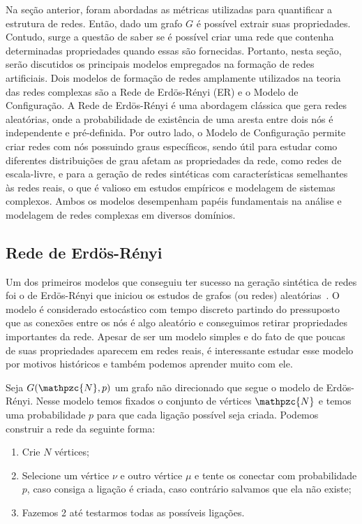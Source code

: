 Na seção anterior, foram abordadas as métricas utilizadas para quantificar a estrutura de redes. Então, dado um grafo $G$ é possível extrair suas propriedades. Contudo, surge a questão de saber se é possível criar uma rede que contenha determinadas propriedades quando essas são fornecidas. Portanto, nesta seção, serão discutidos os principais modelos empregados na formação de redes artificiais. Dois modelos de formação de redes amplamente utilizados na teoria das redes complexas são a Rede de Erdös-Rényi (ER) e o Modelo de Configuração. A Rede de Erdös-Rényi é uma abordagem clássica que gera redes aleatórias, onde a probabilidade de existência de uma aresta entre dois nós é independente e pré-definida. Por outro lado, o Modelo de Configuração permite criar redes com nós possuindo graus específicos, sendo útil para estudar como diferentes distribuições de grau afetam as propriedades da rede, como redes de escala-livre, e para a geração de redes sintéticas com características semelhantes às redes reais, o que é valioso em estudos empíricos e modelagem de sistemas complexos. Ambos os modelos desempenham papéis fundamentais na análise e modelagem de redes complexas em diversos domínios.

\subsection{Rede de Erdös-Rényi}

Um dos primeiros modelos que conseguiu ter sucesso na geração sintética de redes foi o de Erdös-Rényi que iniciou os estudos de grafos (ou redes) aleatórias~\cite{Erdos:1959:pmd}. O modelo é considerado estocástico com tempo discreto partindo do pressuposto que as conexões entre os nós é algo aleatório e conseguimos retirar propriedades importantes da rede. 
Apesar de ser um modelo simples e do fato de que 
poucas de suas 
propriedades aparecem em redes reais, é interessante estudar esse modelo por motivos históricos e também podemos aprender muito com ele.

Seja $G(\mathpzc{N},p)$ um grafo não direcionado que segue o modelo de Erdös-Rényi. Nesse modelo temos fixados o conjunto de vértices $\mathpzc{N}$ e temos uma probabilidade $p$ para que cada ligação 
possível seja criada. Podemos construir a rede da seguinte forma:
\begin{enumerate}
  \item Crie $N$ vértices;
  \item Selecione um vértice $\nu$ e outro vértice $\mu$ e tente os conectar com probabilidade $p$, caso consiga a ligação é criada, caso contrário salvamos que ela não existe;
  \item Fazemos 2 até testarmos todas as possíveis ligações.
\end{enumerate}

